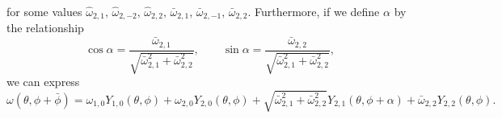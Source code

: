 \documentclass{amsart}
\begin{document}
for some values $\hat\omega_{2,1},\,\hat\omega_{2,-2},\,\hat\omega_{2,2},\,\bar\omega_{2,1},\,\bar\omega_{2,-1},\,\bar\omega_{2,2}$.
Furthermore, if we define $\alpha$ by the relationship
$$
\cos\alpha= \frac{\bar\omega_{2,1}}{\sqrt{\bar\omega^2_{2,1}+\bar\omega^2_{2,2}}},\qquad\sin\alpha= \frac{\bar\omega_{2,2}}{\sqrt{\bar\omega^2_{2,1}+\bar\omega^2_{2,2}}},
$$
we can express 
\begin{equation}\label{eq:3rdrep}
\omega(\theta,\phi+\bar\phi)=\omega_{1,0}  Y_{1,0}(\theta,\phi)+\omega_{2,0} Y_{2,0}(\theta,\phi)+\sqrt{\bar\omega^2_{2,1}+\bar\omega^2_{2,2}} Y_{2,1}(\theta,\phi+\alpha)+\bar\omega_{2,2} Y_{2,2}(\theta,\phi).
\end{equation}
\end{document}
